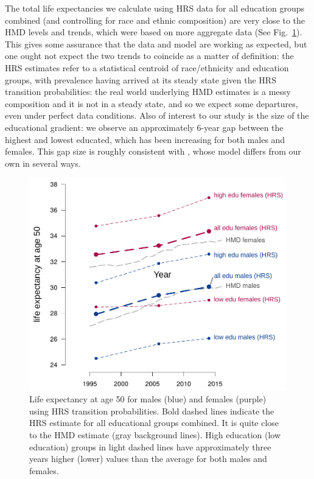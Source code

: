 The total life expectancies we calculate using HRS data for all education groups combined (and controlling for race and ethnic composition) are very close to the HMD levels and trends, which were based on more aggregate data (See Fig.~\ref{fig:e50}). This gives some assurance that the data and model are working as expected, but one ought not expect the two trends to coincide as a matter of definition: the HRS estimates refer to a statistical centroid of race/ethnicity and education groups, with prevalence having arrived at its steady state given the HRS transition probabilities: the real world underlying HMD estimates is a messy composition and it is not in a steady state, and so we expect some departures, even under perfect data conditions. Also of interest to our study is the size of the educational gradient: we observe an approximately 6-year gap between the highest and lowest educated, which has been increasing for both males and females. This gap size is roughly consistent with \citet{montez2014cumulative}, whose model differs from our own in several ways.

\begin{figure}[ht!]
\centering
\includegraphics[scale=.7]{Figures/e50_Ink.pdf}
\caption{Life expectancy at age 50 for males (blue) and females (purple) using HRS transition probabilities. Bold dashed lines indicate the HRS estimate for all educational groups combined. It is quite close to the HMD estimate (gray background lines). High education (low education) groups in light dashed lines have approximately three years higher (lower) values than the average for both males and females.}
\label{fig:e50}
\end{figure}


